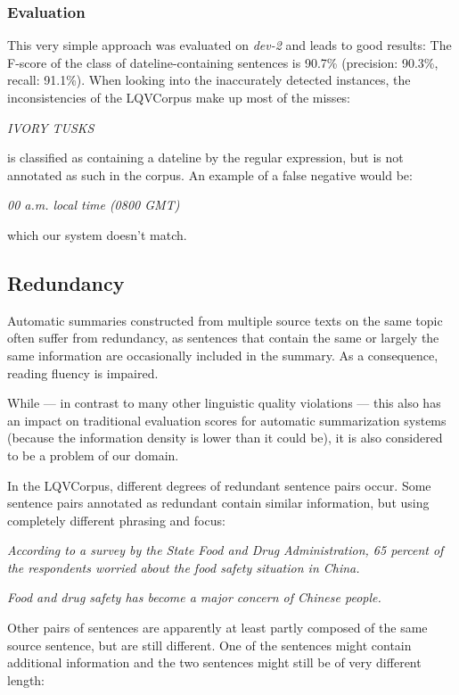 \documentclass[a4paper,10pt]{scrartcl}
\theoremstyle{style}
\begin{document}
\subsubsection{Evaluation}
This very simple approach was evaluated on \textit{dev-2} and leads to good results: The F-score of the class of dateline-containing sentences is 90.7\% (precision: 90.3\%, recall: 91.1\%). When looking into the inaccurately detected instances, the inconsistencies of the LQVCorpus make up most of the misses:

\textit{IVORY TUSKS}

is classified as containing a dateline by the regular expression, but is not annotated as such in the corpus. An example of a false negative would be:

\textit{00 a.m. local time (0800 GMT)}

which our system doesn't match.

\subsection{Redundancy}
\label{redundancy}

Automatic summaries constructed from multiple source texts on the same topic often suffer from redundancy, as sentences that contain the same or largely the same information are occasionally included in the summary. As a consequence, reading fluency is impaired.

While --- in contrast to many other linguistic quality violations --- this also has an impact on traditional evaluation scores for automatic summarization systems (because the information density is lower than it could be), it is also considered to be a problem of our domain.

In the LQVCorpus, different degrees of redundant sentence pairs occur. Some sentence pairs annotated as redundant contain similar information, but using completely different phrasing and focus:

\textit{According to a survey by the State Food and Drug Administration, 65 percent of the respondents worried about the food safety situation in China.}

\textit{Food and drug safety has become a major concern of Chinese people.}

Other pairs of sentences are apparently at least partly composed of the same source sentence, but are still different. One of the sentences might contain additional information and the two sentences might still be of very different length:
\end{document}
